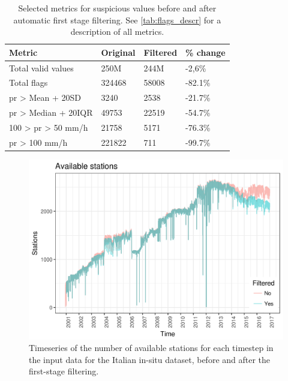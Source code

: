 \begin{table}[]
\centering
\begin{tabular}{@{}llll@{}}
\toprule
Metric                                   & Original & Filtered & \% change \\ \midrule
Total valid values                       & 250M     & 244M     & -2,6\%    \\
Total flags                              & 324468   & 58008    & -82.1\%   \\
pr \textgreater{} Mean + 20SD              & 3240     & 2538     & -21.7\%   \\
pr \textgreater{} Median + 20IQR           & 49753    & 22519    & -54.7\%   \\
100 \textgreater{} pr \textgreater{} 50 mm/h & 21758    & 5171     & -76.3\%   \\
pr \textgreater{} 100 mm/h                 & 221822   & 711      & -99.7\%       
\end{tabular}
\decoRule
\caption[Metrics for suspicious values before and after automatic first stage filtering]{Selected metrics for suspicious values before and after automatic first stage filtering. See \cref{tab:flags_descr} for a description of all metrics.}  \label{tab:flags_res}
\end{table}

\begin{figure}
    \centering
    \includegraphics[width=\textwidth]{figures/rain_dst/filVSnofil_station_count_line}
    \decoRule
    \caption[Count of available stations per timestep, filtered and non-filtered]{Timeseries of the number of available stations for each timestep in the input data for the Italian in-situ dataset, before and after the first-stage filtering.} \label{fig:filVSnofil_station_count_line}
\end{figure}


